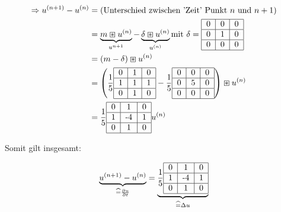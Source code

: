 \documentclass{article}
\theoremstyle{plain}
\theoremstyle{definition}
\numberwithin{equation}{section}
\begin{document}
    \begin{align*}
        \Rightarrow u^{(n+1)} - u^{(n)} & = \text{(Unterschied zwischen 'Zeit' Punkt $n$ und $n+1$)}\\
        &= \underbrace{m \boxast u^{(n)}}_{u^{n+1}} - \underbrace{\delta \boxast u^{(n)}}_{u^{(n)}} \text{mit } \delta = \begin{tabular}{|c|c|c|}
            \hline
            0 & 0 & 0\\
            \hline
            0 & 1 & 0\\
            \hline
            0 & 0 & 0\\
            \hline
        \end{tabular}\\
        &=(m - \delta) \boxast u^{(n)}\\
        &=\left( \frac{1}{5}\begin{tabular}{|c|c|c|}
            \hline
            0 & 1 & 0\\
            \hline
            1 & 1 & 1\\
            \hline
            0 & 1 & 0\\
            \hline
        \end{tabular} - \frac{1}{5} \begin{tabular}{|c|c|c|}
            \hline
            0 & 0 & 0\\
            \hline
            0 & 5 & 0\\
            \hline
            0 & 0 & 0\\
            \hline
        \end{tabular}\right) \boxast u^{(n)}\\
        &= \frac{1}{5} \begin{tabular}{|c|c|c|}
            \hline
            0 & 1 & 0\\
            \hline
            1 & -4 & 1\\
            \hline
            0 & 1 & 0\\
            \hline
        \end{tabular} u^{(n)}
    \end{align*}

    Somit gilt insgesamt:

    \begin{equation}\label{eq:5.11}
        \underbrace{u^{(n+1)} - u^{(n)}}_{\widehat = \frac{\partial u}{\partial t}} = \underbrace{\frac{1}{5} \begin{tabular}{|c|c|c|}
            \hline
            0 & 1 & 0\\
            \hline
            1 & -4 & 1\\
            \hline
            0 & 1 & 0\\
            \hline
        \end{tabular}}_{\widehat = \Delta u}
    \end{equation}
\end{document}
